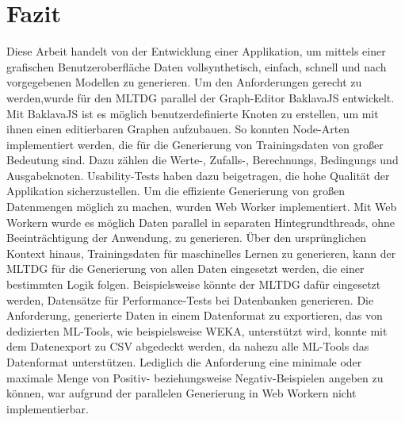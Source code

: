 
\chapter{Fazit}

Diese Arbeit handelt von der Entwicklung einer Applikation, um mittels einer grafischen Benutzeroberfläche Daten vollsynthetisch, einfach, schnell und nach vorgegebenen Modellen zu generieren. Um den Anforderungen gerecht zu werden,wurde für den \ac{MLTDG} parallel der Graph-Editor BaklavaJS entwickelt. Mit BaklavaJS ist es möglich benutzerdefinierte Knoten zu erstellen, um mit ihnen einen editierbaren Graphen aufzubauen. So konnten Node-Arten implementiert werden, die für die Generierung von Trainingsdaten von großer Bedeutung sind. Dazu zählen die Werte-, Zufalls-, Berechnungs, Bedingungs und Ausgabeknoten. Usability-Tests haben dazu beigetragen, die hohe Qualität der Applikation sicherzustellen. Um die effiziente Generierung von großen Datenmengen möglich zu machen, wurden Web Worker implementiert. Mit Web Workern wurde es möglich  Daten parallel in separaten Hintegrundthreads, ohne Beeinträchtigung der Anwendung, zu generieren. Über den ursprünglichen Kontext hinaus, Trainingsdaten für maschinelles Lernen zu generieren, kann der \ac{MLTDG} für die Generierung von allen Daten eingesetzt werden, die einer bestimmten Logik folgen. Beispielsweise könnte der \ac{MLTDG} dafür eingesetzt werden, Datensätze für Performance-Tests bei Datenbanken generieren. Die Anforderung, generierte Daten in einem Datenformat zu exportieren, das von dedizierten \ac{ML}-Tools, wie beispielsweise WEKA, unterstützt wird, konnte mit dem Datenexport zu \ac{CSV} abgedeckt werden, da nahezu alle \ac{ML}-Tools das Datenformat unterstützen. Lediglich die Anforderung eine minimale oder maximale Menge von Positiv- beziehungsweise Negativ-Beispielen angeben zu können, war aufgrund der parallelen Generierung in Web Workern nicht implementierbar.